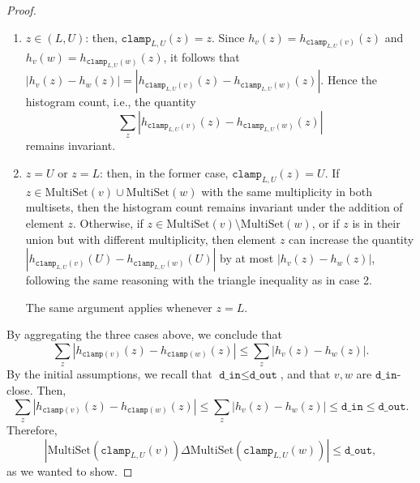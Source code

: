 \documentclass[11pt,a4paper]{article}
\theoremstyle{definition}
\newcommand{\MultiSet}{\mathrm{MultiSet}}
\newcommand{\din}{\texttt{d\_in}}
\newcommand{\dout}{\texttt{d\_out}}
\newcommand{\clamp}{\texttt{clamp}}
\newcommand{\silvia}[1]{{ {\color{blue}{(silvia)~#1}}}}
\newcommand{\grace}[1]{{ {\color{purple}{(grace)~#1}}}}
\begin{document}
\begin{proof}
\begin{enumerate}
    \item $z \in (L, U)$: then, $\clamp_{L, U}(z) = z$. Since $h_v(z) = h_{\clamp_{L, U}(v)}(z)$ and $h_v(w) = h_{\clamp_{L, U}(w)}(z)$, it follows that $|h_v(z) - h_w(z)| = |h_{\clamp_{L, U}(v)}(z) - h_{\clamp_{L, U}(w)}(z)|$. Hence the histogram count, i.e., the quantity
     \[
        \sum_z |h_{\clamp_{L, U}(v)}(z) - h_{\clamp_{L, U}(w)}(z)|
    \]
    remains invariant.
    
    
    \item $z = U$ or $z = L$: then, in the former case, $\clamp_{L, U}(z) = U$. If $z \in \MultiSet(v) \cup \MultiSet(w)$ with the same multiplicity in both multisets, then the histogram count remains invariant under the addition of element $z$. Otherwise, if $z \in \MultiSet(v) \setminus \MultiSet(w)$, or if $z$ is in their union but with different multiplicity, then element $z$ can increase the quantity $|h_{\clamp_{L, U}(v)}(U) - h_{\clamp_{L, U}(w)}(U)|$ by at most $|h_v(z)-h_w(z)|$, following the same reasoning with the triangle inequality as in case 2.
    
    The same argument applies whenever $z = L$.
\end{enumerate}


By aggregating the three cases above, we conclude that
\[
\sum_z |h_{\texttt{clamp}(v)}(z) - h_{\texttt{clamp}(w)}(z)| \leq \sum_z |h_v(z) - h_w(z)|.
\]
By the initial assumptions, we recall that $\din \leq \dout$, and that $v, w$ are $\din$-close. Then,
\[
\sum_z |h_{\texttt{clamp}(v)}(z) - h_{\texttt{clamp}(w)}(z)| \leq \sum_z |h_v(z) - h_w(z)| \leq \din \leq \dout.
\]
Therefore, 
\[
|\MultiSet(\clamp_{L, U}(v)) \Delta \MultiSet(\clamp_{L, U}(w))| \leq \dout,
\]
as we wanted to show.

\end{proof}
\silvia{Maybe add domain of $z$ below the sum}
\grace{Great, very rigorous}

\end{document}

